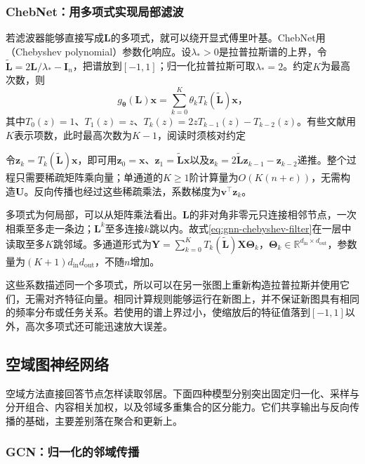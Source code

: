 \subsubsection{ChebNet：用多项式实现局部滤波}
\label{sec:gnn-chebnet}

若滤波器能够直接写成$\bm{L}$的多项式，就可以绕开显式傅里叶基。ChebNet用（Chebyshev polynomial）参数化响应。设$\lambda_*>0$是拉普拉斯谱的上界，令$\widetilde{\bm{L}}=2\bm{L}/\lambda_*-\bm{I}_n$，把谱放到$[-1,1]$；归一化拉普拉斯可取$\lambda_*=2$。约定$K$为最高次数，则
\begin{equation}
  g_{\bm{\theta}}(\bm{L})\bm{x}
    =\sum_{k=0}^{K}\theta_k T_k(\widetilde{\bm{L}})\bm{x}\text{，}
  \label{eq:gnn-chebyshev-filter}
\end{equation}
其中$T_0(z)=1$、$T_1(z)=z$、$T_k(z)=2zT_{k-1}(z)-T_{k-2}(z)$。有些文献用$K$表示项数，此时最高次数为$K-1$，阅读时须核对约定

令$\bm{z}_k=T_k(\widetilde{\bm{L}})\bm{x}$，即可用$\bm{z}_0=\bm{x}$、$\bm{z}_1=\widetilde{\bm{L}}\bm{x}$以及$\bm{z}_k=2\widetilde{\bm{L}}\bm{z}_{k-1}-\bm{z}_{k-2}$递推。整个过程只需要稀疏矩阵乘向量；单通道的$K\geq1$阶计算量为$O(K(n+e))$，无需构造$\bm{U}$。反向传播也经过这些稀疏乘法，系数梯度为$\bm{v}^{\top}\bm{z}_k$。

多项式为何局部，可以从矩阵乘法看出。$\bm{L}$的非对角非零元只连接相邻节点，一次相乘至多走一条边；$\bm{L}^k$至多连接$k$跳以内。故式\eqref{eq:gnn-chebyshev-filter}在一层中读取至多$K$跳邻域。多通道形式为$\bm{Y}=\sum_{k=0}^{K}T_k(\widetilde{\bm{L}})\bm{X}\bm{\Theta}_k$，$\bm{\Theta}_k\in\mathbb{R}^{d_{\mathrm{in}}\times d_{\mathrm{out}}}$，参数量为$(K+1)d_{\mathrm{in}}d_{\mathrm{out}}$，不随$n$增加。

这些系数描述同一个多项式，所以可以在另一张图上重新构造拉普拉斯并使用它们，无需对齐特征向量。相同计算规则能够运行在新图上，并不保证新图具有相同的频率分布或任务关系。若使用的谱上界过小，使缩放后的特征值落到$[-1,1]$以外，高次多项式还可能迅速放大误差。

\subsection{空域图神经网络}
\label{sec:gnn-spatial}

空域方法直接回答节点怎样读取邻居。下面四种模型分别突出固定归一化、采样与分开组合、内容相关加权，以及邻域多重集合的区分能力。它们共享输出与反向传播的基础，主要差别落在聚合和更新上。

\subsubsection{GCN：归一化的邻域传播}
\label{sec:gnn-gcn}

